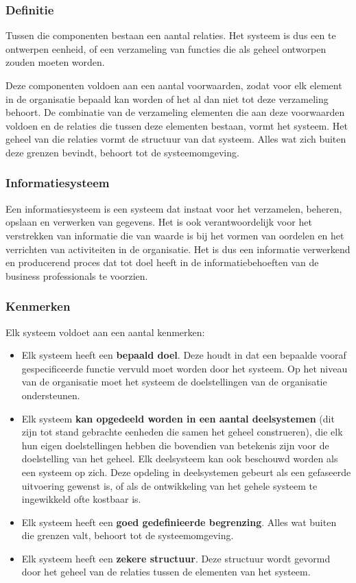 \subsubsection{Definitie}

Tussen die componenten bestaan een aantal relaties. Het systeem is dus een te ontwerpen eenheid, of een verzameling van functies die als geheel ontworpen zouden moeten worden.

Deze componenten voldoen aan een aantal voorwaarden, zodat voor elk element in de organisatie bepaald kan worden of het al dan niet tot deze verzameling behoort. De combinatie van de verzameling elementen die aan deze voorwaarden voldoen en de relaties die tussen deze elementen bestaan, vormt het systeem. Het geheel van die relaties vormt de structuur van dat systeem. Alles wat zich buiten deze grenzen bevindt, behoort tot de systeemomgeving.

\subsubsection{Informatiesysteem}

Een informatiesysteem is een systeem dat instaat voor het verzamelen, beheren, opslaan en verwerken van gegevens. Het is ook verantwoordelijk voor het verstrekken van informatie die van waarde is bij het vormen van oordelen en het verrichten van activiteiten in de organisatie. Het is dus een informatie verwerkend en producerend proces dat tot doel heeft in de informatiebehoeften van de business professionals te voorzien.

\subsubsection{Kenmerken}

Elk systeem voldoet aan een aantal kenmerken:

\begin{itemize}
\item Elk systeem heeft een \textbf{bepaald doel}. Deze houdt in dat een bepaalde vooraf gespecificeerde functie vervuld moet worden door het systeem. Op het niveau van de organisatie moet het systeem de doelstellingen van de organisatie ondersteunen.
\item Elk systeem \textbf{kan opgedeeld worden in een aantal deelsystemen} (dit zijn tot stand gebrachte eenheden die samen het geheel construeren), die elk hun eigen doelstellingen hebben die bovendien van betekenis zijn voor de doelstelling van het geheel. Elk deelsysteem kan ook beschouwd worden als een systeem op zich. Deze opdeling in deelsystemen gebeurt als een gefaseerde uitvoering gewenst is, of als de ontwikkeling van het gehele systeem te ingewikkeld ofte kostbaar is.
\item Elk systeem heeft een \textbf{goed gedefinieerde begrenzing}. Alles wat buiten die grenzen valt, behoort tot de systeemomgeving.
\item Elk systeem heeft een \textbf{zekere structuur}. Deze structuur wordt gevormd door het geheel van de relaties tussen de elementen van het systeem.
\end{itemize}

